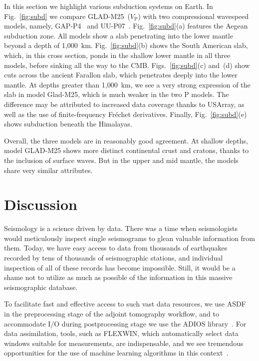 \documentclass[extra,mreferee]{gji}
\begin{document}
In this section we highlight various subduction systems on Earth.
In Fig.~\ref{fig:subd} we compare GLAD-M25~($V_\textrm{P}$) with two compressional wavespeed models,
namely, GAP-P4~\citep{fukao2013subducted} and UU-P07~\citep{van2018atlas}.
Fig.~\ref{fig:subd}(a) features the Aegean subduction zone. All models show a slab penetrating into the lower mantle beyond a depth of 1,000~km.
Fig.~\ref{fig:subd}(b) shows the South American slab, which, in this cross section, ponds in the shallow lower mantle in all three models, before sinking all the way to the CMB.
Figs.~\ref{fig:subd}(c) and~(d) show cuts across the ancient Farallon slab, which penetrates deeply into the lower mantle.
At depths greater than 1,000~km, 
we see a very strong expression of the slab in model Glad-M25, which is much weaker in the two P models.
The difference may be attributed to increased data coverage thanks to USArray, as well as the use of finite-frequency Fr\'echet derivatives.
Finally, Fig.~\ref{fig:subd}(e) shows subduction beneath the Himalayas.

Overall, the three models are in reasonably good agreement.
At shallow depths, model GLAD-M25 shows more distinct continental crust and cratons, thanks to the inclusion of surface waves.
But in the upper and mid mantle,
the models share very similar attributes.

\section{Discussion}

Seismology is a science driven by data.
There was a time when seismologists would meticulously inspect single seismograms to glean valuable information from them.
Today, we have easy access to data from thousands of earthquakes recorded by tens of thousands of seismographic stations, and individual inspection of all of these records has become impossible.
Still, it would be a shame not to utilize as much as possible of the information in this massive seismographic database.

To facilitate fast and effective access to such vast data resources,
we use ASDF~\citep{krischer2016adaptable} in the preprocessing stage of the adjoint tomography workflow,
and to accommodate I/O during postprocessing stage we use the ADIOS library~\citep{liu2014hello}.
For data assimilation,
tools, such as FLEXWIN, which automatically select data windows suitable for measurements,
are indispensable, and we see tremendous opportunities for the use of machine learning algorithms in this context~\citep[e.g.,][]{chen2017}.
\end{document}
